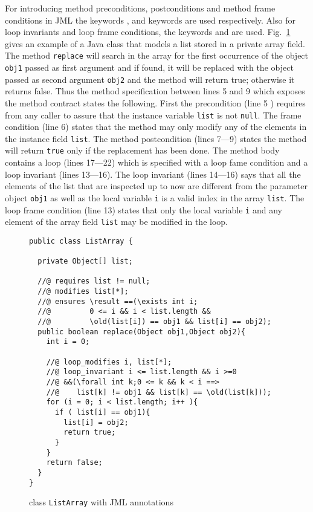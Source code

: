 For introducing method preconditions, postconditions and method frame conditions in JML the keywords ,
  and  keywords are used  respectively. Also for loop invariants and loop frame conditions,
 the keywords  and  are used.
Fig.~\ref{replaceSrc} gives an example of a Java class that models a list stored in a private array field. 
The method \texttt{replace} will search in the array for the first occurrence of the object \texttt{obj1} passed as first argument
 and if found, it will be replaced with the object passed as second argument \texttt{obj2} and the method will return true; otherwise it 
returns false. Thus the method  specification between lines 5 and 9 which exposes the method contract states the following.
First the precondition (line 5 ) requires from any caller to assure that the instance variable \texttt{list} is not \texttt{null}.
The frame condition (line  6) states that the method may only
modify any of the elements in the instance field \texttt{list}. The method postcondition (lines 7---9) states the method will return 
\texttt{true} only if  the replacement has been done.
The method body contains a loop (lines 17---22) which is specified with a loop fame condition and a loop invariant (lines 13---16).
  The loop invariant (lines 14---16) says that all the elements of the list that are inspected up to now are 
 different from the parameter object \texttt{obj1} as well as the local variable \texttt{i}  is a valid index in the array \texttt{list}.
 The loop frame condition (line 13)  states that only the local variable \texttt{i} and any element of the array field \texttt{list} may be modified in the loop.

\begin{figure}[ht!]
\begin{lstlisting}[frame=trbl] 
public class ListArray {
  
  private Object[] list;
  
  //@ requires list != null;
  //@ modifies list[*];
  //@ ensures \result ==(\exists int i; 
  //@         0 <= i && i < list.length && 
  //@         \old(list[i]) == obj1 && list[i] == obj2);
  public boolean replace(Object obj1,Object obj2){
    int i = 0;
    
    //@ loop_modifies i, list[*];
    //@ loop_invariant i <= list.length && i >=0 
    //@ &&(\forall int k;0 <= k && k < i ==> 
    //@    list[k] != obj1 && list[k] == \old(list[k]));
    for (i = 0; i < list.length; i++ ){
      if ( list[i] == obj1){
        list[i] = obj2;
        return true;	
      }
    }
    return false;
  }
}
\end{lstlisting}
\caption{\sc class \mbox{\rm \lstinline!ListArray!} with JML annotations} 
\label{replaceSrc}
\end{figure}


